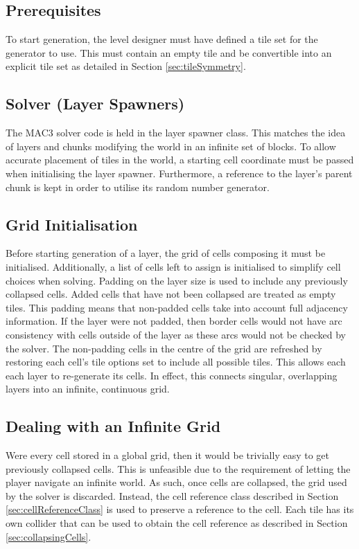 \subsection{Prerequisites}
To start generation, the level designer must have defined a tile set for the generator to use. This must contain an empty tile and be convertible into an explicit tile set as detailed in Section \ref{sec:tileSymmetry}.

\subsection{Solver (Layer Spawners)}
The MAC3 solver code is held in the layer spawner class. This matches the idea of layers and chunks modifying the world in an infinite set of blocks. To allow accurate placement of tiles in the world, a starting cell coordinate must be passed when initialising the layer spawner. Furthermore, a reference to the layer's parent chunk is kept in order to utilise its random number generator.

\subsection{Grid Initialisation}
Before starting generation of a layer, the grid of cells composing it must be initialised. Additionally, a list of cells left to assign is initialised to simplify cell choices when solving. Padding on the layer size is used to include any previously collapsed cells. Added cells that have not been collapsed are treated as empty tiles. This padding means that non-padded cells take into account full adjacency information. If the layer were not padded, then border cells would not have arc consistency with cells outside of the layer as these arcs would not be checked by the solver. The non-padding cells in the centre of the grid are refreshed by restoring each cell's tile options set to include all possible tiles. This allows each each layer to re-generate its cells. In effect, this connects singular, overlapping layers into an infinite, continuous grid.%


\subsection{Dealing with an Infinite Grid}
Were every cell stored in a global grid, then it would be trivially easy to get previously collapsed cells. This is unfeasible due to the requirement of letting the player navigate an infinite world. As such, once cells are collapsed, the grid used by the solver is discarded. Instead, the cell reference class described in Section \ref{sec:cellReferenceClass} is used to preserve a reference to the cell. Each tile has its own collider that can be used to obtain the cell reference as described in Section \ref{sec:collapsingCells}.%

